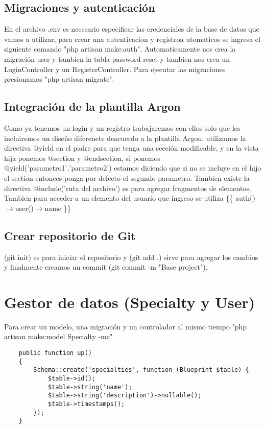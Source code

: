 \documentclass[a4paper]{article}
\begin{document}
	\subsection{Migraciones y autenticación}
	En el archivo .env es necesario especificar las credenciales de la base de datos que vamos a utilizar, para crear una autenticacion y registroa utomaticos se ingresa el siguiente comando  "php artisan make:auth". Automaticamente nos crea la migración user y tambien la tabla password-reset y tambien nos crea un LoginController y un RegisterController. Para ejecutar las migraciones presionamos "php artisan migrate".
	
	\subsection{Integración de la plantilla Argon}
	Como ya tenemos un login y un registro trabajaremos con ellos solo que les incluiremos un diseño diferenete deacuerdo a la plantilla Argon. utilizamos la directiva @yield en el padre para que tenga una sección modificable, y en la vista hija ponemos @section y @endsection, si ponemos @yield('parametro1','parametro2') estamos diciendo que si no se incluye en el hijo el section entonces ponga por defecto el segundo parametro.
	Tambien existe la directiva @include('ruta del archivo') es para agregar fragmentos de elementos. Tambien para acceder a un elemento del usuario que ingreso se utiliza  \{\{ auth()$\rightarrow$user()$\rightarrow$name \}\}
	
	\subsection{Crear repositorio de Git}
	(git init) es para iniciar el repositorio y (git add .) sirve para agregar los cambios y finalmente creamos un commit (git commit -m "Base project"). 
	
	
	\section{Gestor de datos (Specialty y User)}
	Para crear un modelo, una migración y un controlador al mismo tiempo "php artisan make:model Specialty -mc"
	
	\begin{lstlisting}
	public function up()
	{
		Schema::create('specialties', function (Blueprint $table) {
			$table->id();
			$table->string('name');
			$table->string('description')->nullable();
			$table->timestamps();
		});
	}
	\end{lstlisting}  
\end{document}
